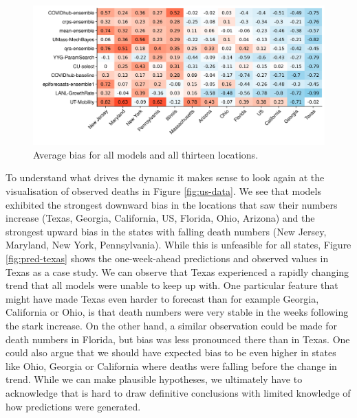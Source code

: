 \documentclass[
]{book}
\begin{document}
\begin{figure}
\includegraphics[width=1\linewidth]{../visualisation/chapter-5-results/scenario-baseline/heatmap-model-bias} \caption{Average bias for all models and all thirteen locations.}\label{fig:bias-states}
\end{figure}

To understand what drives the dynamic it makes sense to look again at the visualisation of observed deaths in Figure \ref{fig:us-data}. We see that models exhibited the strongest downward bias in the locations that saw their numbers increase (Texas, Georgia, California, US, Florida, Ohio, Arizona) and the strongest upward bias in the states with falling death numbers (New Jersey, Maryland, New York, Pennsylvania). While this is unfeasible for all states, Figure \ref{fig:pred-texas} shows the one-week-ahead predictions and observed values in Texas as a case study. We can observe that Texas experienced a rapidly changing trend that all models were unable to keep up with. One particular feature that might have made Texas even harder to forecast than for example Georgia, California or Ohio, is that death numbers were very stable in the weeks following the stark increase. On the other hand, a similar observation could be made for death numbers in Florida, but bias was less pronounced there than in Texas. One could also argue that we should have expected bias to be even higher in states like Ohio, Georgia or California where deaths were falling before the change in trend. While we can make plausible hypotheses, we ultimately have to acknowledge that is hard to draw definitive conclusions with limited knowledge of how predictions were generated.
\end{document}

